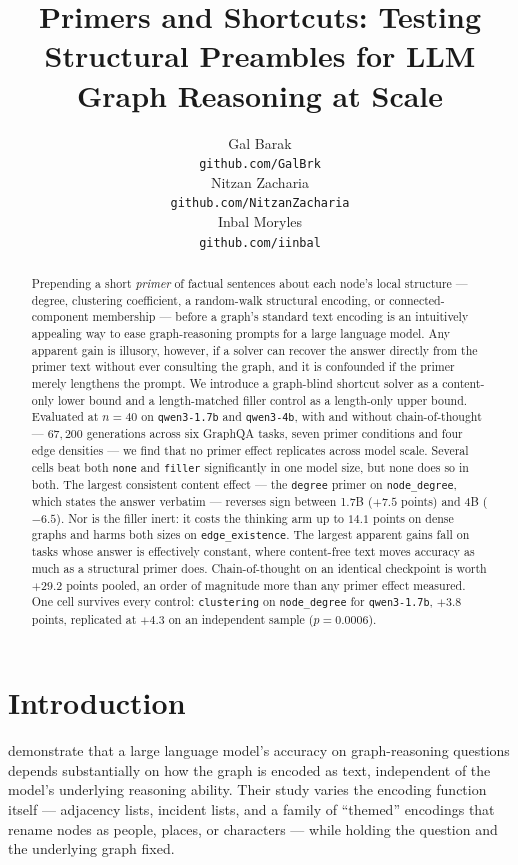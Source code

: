 \documentclass[11pt]{article}
\title{Primers and Shortcuts: Testing Structural Preambles for LLM Graph Reasoning at Scale}
\author{
  Gal Barak \\
  \footnotesize\texttt{github.com/GalBrk} \\\And
  Nitzan Zacharia \\
  \footnotesize\texttt{github.com/NitzanZacharia} \\\And
  Inbal Moryles \\
  \footnotesize\texttt{github.com/iinbal} \\
}
\begin{document}
\maketitle

\begin{abstract}
Prepending a short \emph{primer} of factual sentences about each node's
local structure --- degree, clustering coefficient, a random-walk
structural encoding, or connected-component membership --- before a
graph's standard text encoding is an intuitively appealing way to ease
graph-reasoning prompts for a large language model. Any apparent gain is
illusory, however, if a solver can recover the answer directly from the
primer text without ever consulting the graph, and it is confounded if the
primer merely lengthens the prompt. We introduce a graph-blind shortcut
solver as a content-only lower bound and a length-matched filler control as
a length-only upper bound. Evaluated at $n=40$ on \texttt{qwen3-1.7b} and
\texttt{qwen3-4b}, with and without chain-of-thought --- $67{,}200$
generations across six GraphQA tasks, seven primer conditions and four edge
densities --- we find that no primer effect replicates across model scale.
Several cells beat both \texttt{none} and \texttt{filler} significantly in
one model size, but none does so in both. The largest consistent content
effect --- the \texttt{degree} primer on \texttt{node\_degree}, which states
the answer verbatim --- reverses sign between 1.7B ($+7.5$ points) and 4B
($-6.5$). Nor is the filler inert: it costs the thinking arm up to $14.1$
points on dense graphs and harms both sizes on \texttt{edge\_existence}.
The largest apparent gains fall on tasks whose answer is effectively
constant, where content-free text moves accuracy as much as a structural
primer does. Chain-of-thought on an identical checkpoint is worth $+29.2$
points pooled, an order of magnitude more than any primer effect measured.
One cell survives every control: \texttt{clustering} on
\texttt{node\_degree} for \texttt{qwen3-1.7b}, $+3.8$ points, replicated at
$+4.3$ on an independent sample ($p=0.0006$).
\end{abstract}

\section{Introduction}
\label{sec:introduction}

\citet{fatemi2023talklikeagraph} demonstrate that a large language model's
accuracy on graph-reasoning questions depends substantially on how the
graph is encoded as text, independent of the model's underlying reasoning
ability. Their study varies the encoding function itself --- adjacency
lists, incident lists, and a family of ``themed'' encodings that rename
nodes as people, places, or characters --- while holding the question and
the underlying graph fixed.
\end{document}
